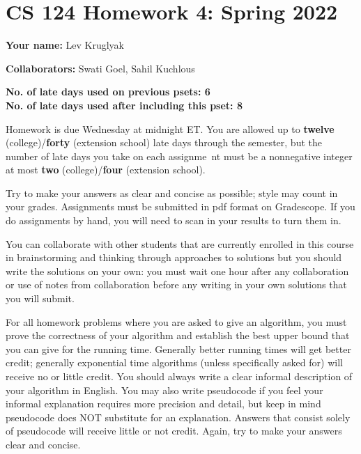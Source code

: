 \documentclass[11pt,letterpaper]{article}
\begin{document}
\section*{CS 124 Homework 4: Spring 2022}

\textbf{Your name:} Lev Kruglyak

\textbf{Collaborators:} Swati Goel, Sahil Kuchlous 

\textbf{No. of late days used on previous psets: 6}\\
\textbf{No. of late days used after including this pset: 8}

Homework is due Wednesday at midnight ET. You are allowed up to {\bf twelve} (college)/{\bf forty} (extension school) late days through the semester, but the number of late days you take on each assignme\
nt must be a nonnegative integer at most {\bf two} (college)/{\bf four} (extension school).

Try to make your answers as clear and concise as possible;
style may count in your grades. Assignments must be submitted in pdf format on Gradescope. If you do assignments by hand, you will need to scan in your results to turn them in.

You can collaborate with other students that are currently enrolled in this
course in brainstorming and thinking through approaches to solutions but you should write
the solutions on your own: you must wait one hour after any collaboration or use of notes
from collaboration before any writing in your own solutions that you will submit. 

For all homework problems where you are asked to give an algorithm, you must prove the correctness
of your algorithm and establish the best upper bound that you can give for the running time. Generally
better running times will get better credit; generally exponential time algorithms (unless specifically asked
for) will receive no or little credit. You should always write a clear informal description of your algorithm
in English. You may also write pseudocode if you feel your informal explanation requires more precision
and detail, but keep in mind pseudocode does NOT substitute for an explanation. Answers that consist
solely of pseudocode will receive little or not credit. Again, try to make your answers clear and concise.
\end{document}
